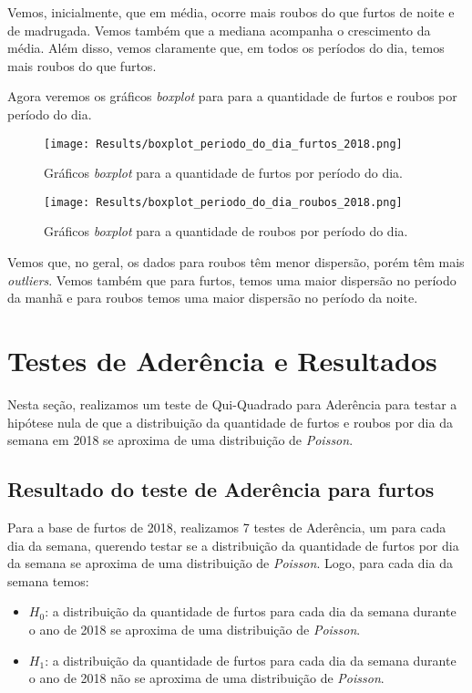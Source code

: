 \documentclass[
	12pt,
	openright,			%
	twoside,			%
	a4paper,			%
	chapter=TITLE,		%
	section=TITLE,		%
	subsection=TITLE,	%
	subsubsection=TITLE,%
	english,			%
	french,				%
	spanish,			%
	brazil				%
	]{abntex2}
\begin{document}
Vemos, inicialmente, que em média, ocorre mais roubos do que furtos de noite e de madrugada. Vemos também que a mediana acompanha o crescimento da média. Além disso, vemos claramente que, em todos os períodos do dia, temos mais roubos do que furtos.

Agora veremos os gráficos  \textit{boxplot} para para a quantidade de furtos e roubos por período do dia.

\begin{figure}
\centering
\texttt{[image: Results/boxplot\_periodo\_do\_dia\_furtos\_2018.png]}
\caption{Gráficos  \textit{boxplot} para a quantidade de furtos por período do dia.}
\end{figure}

\begin{figure}
\centering
\texttt{[image: Results/boxplot\_periodo\_do\_dia\_roubos\_2018.png]}
\caption{Gráficos \textit{boxplot} para a quantidade de roubos por período do dia.}
\end{figure}

Vemos que, no geral, os dados para roubos têm menor dispersão, porém têm mais \textit{outliers}. Vemos também que para furtos, temos uma maior dispersão no período da manhã e para roubos temos uma maior dispersão no período da noite.

\section{Testes de Aderência e Resultados}
Nesta seção, realizamos um teste de Qui-Quadrado para Aderência para testar a hipótese nula de que a distribuição da quantidade de furtos e roubos por dia da semana em 2018 se aproxima de uma distribuição de \textit{Poisson}.

\subsection{Resultado do teste de Aderência para furtos}
Para a base de furtos de 2018, realizamos 7 testes de Aderência, um para cada dia da semana, querendo testar se a distribuição da quantidade de furtos por dia da semana se aproxima de uma distribuição de \textit{Poisson}.
Logo, para cada dia da semana temos:

\begin{itemize}
    \item $H_0$: a distribuição da quantidade de furtos para cada dia da semana durante o ano de 2018 se aproxima de uma distribuição de \textit{Poisson}.
    \item $H_1$: a distribuição da quantidade de furtos para cada dia da semana durante o ano de 2018 não se aproxima de uma distribuição de \textit{Poisson}.
\end{itemize}
\end{document}
